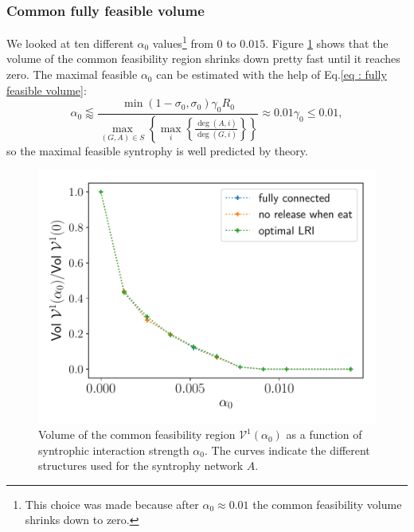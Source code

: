 \documentclass[12pt, titlepage]{report}
\begin{document}
  \subsubsection{Common fully feasible volume}
  We looked at ten different $\alpha_0$ values\footnote{This choice was made because after $\alpha_0 \approx 0.01$ the common feasibility volume shrinks down to zero.} from $0$ to $0.015$. Figure \ref{fig : feasibility results volume of cfr depending on syntrophy} shows that the volume of the common feasibility region shrinks down pretty fast until it reaches zero. The maximal feasible $\alpha_0$ can be estimated with the help of Eq.\eqref{eq : fully feasible volume}:
  \begin{equation}
  \alpha_0 \lessapprox \frac{\min(1-\sigma_0, \sigma_0)\gamma_0 R_0}{\max_{(G,A)\in S}\left\{\max_i\left\{\frac{\deg(A,i)}{\deg(G,i)}\right\}\right\}} \approx 0.01 \gamma_0 \leq 0.01,
  \end{equation}
  so the maximal feasible syntrophy is well predicted by theory.
\begin{figure}
\centering
\includegraphics[width=0.7\linewidth]{measure_common_feasibility_volume_varying_syntrophy}
\caption{Volume of the common feasibility region $\mathcal{V}^1(\alpha_0)$ as a function of syntrophic interaction strength $\alpha_0$. The curves indicate the different structures used for the syntrophy network $A$.}\label{fig : feasibility results volume of cfr depending on syntrophy}
\end{figure}
\end{document}
